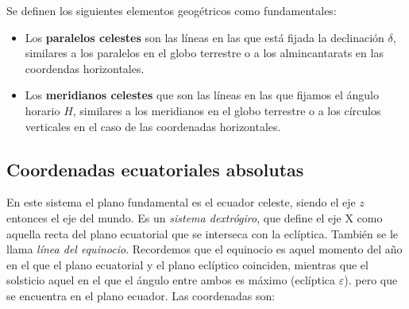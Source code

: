 Se definen los siguientes elementos geogétricos como fundamentales: 

\begin{itemize}
	\item Los \textbf{paralelos celestes} son las líneas en las que está fijada la declinación $\delta$, similares a los paralelos en el globo terrestre o a los almincantarats en las coordendas horizontales. 
	\item Los \textbf{meridianos celestes} que son las líneas en las que fijamos el ángulo horario $H$, similares a los meridianos en el globo terrestre o a los círculos verticales en el caso de las coordenadas horizontales. 	
\end{itemize}

\subsection{Coordenadas ecuatoriales absolutas}

En este sistema el plano fundamental es el ecuador celeste, siendo el eje $z$ entonces el eje del mundo. Es un \textit{sistema dextrógiro}, que define el eje X como aquella recta del plano ecuatorial que se interseca con la eclíptica. También se le llama \textit{línea del equinocio}. Recordemos que el equinocio es aquel momento del año en el que el plano ecuatorial y el plano eclíptico coinciden, mientras que el solsticio aquel en el que el ángulo entre ambos es máximo (eclíptica $\varepsilon$). pero que se encuentra en el plano ecuador. Las coordenadas son:

